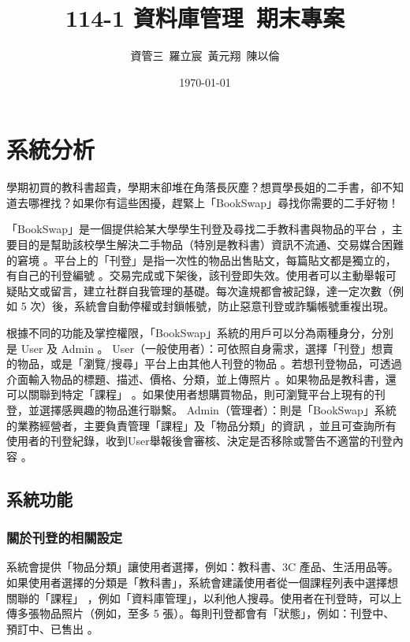 \documentclass[a4paper]{article}
\title{114-1 資料庫管理\ 期末專案}
\author{資管三~羅立宸~黃元翔~陳以倫}
\date{\today} %
\begin{document}
\maketitle %

\section{系統分析} %
學期初買的教科書超貴，學期末卻堆在角落長灰塵？想買學長姐的二手書，卻不知道去哪裡找？如果你有這些困擾，趕緊上「BookSwap」尋找你需要的二手好物！

「BookSwap」是一個提供給某大學學生刊登及尋找二手教科書與物品的平台 ，主要目的是幫助該校學生解決二手物品（特別是教科書）資訊不流通、交易媒合困難的窘境 。平台上的「刊登」是指一次性的物品出售貼文，每篇貼文都是獨立的，有自己的刊登編號 。交易完成或下架後，該刊登即失效。使用者可以主動舉報可疑貼文或留言，建立社群自我管理的基礎。每次違規都會被記錄，達一定次數（例如 5 次）後，系統會自動停權或封鎖帳號，防止惡意刊登或詐騙帳號重複出現。

根據不同的功能及掌控權限，「BookSwap」系統的用戶可以分為兩種身分，分別是 User 及 Admin 。
User（一般使用者）：可依照自身需求，選擇「刊登」想賣的物品，或是「瀏覽/搜尋」平台上由其他人刊登的物品 。若想刊登物品，可透過介面輸入物品的標題、描述、價格、分類，並上傳照片 。如果物品是教科書，還可以關聯到特定「課程」 。如果使用者想購買物品，則可瀏覽平台上現有的刊登，並選擇感興趣的物品進行聯繫。
Admin（管理者）：則是「BookSwap」系統的業務經營者，主要負責管理「課程」及「物品分類」的資訊 ，並且可查詢所有使用者的刊登紀錄，收到User舉報後會審核、決定是否移除或警告不適當的刊登內容 。
\subsection{系統功能}
\subsubsection{關於刊登的相關設定}
系統會提供「物品分類」讓使用者選擇，例如：教科書、3C 產品、生活用品等。如果使用者選擇的分類是「教科書」，系統會建議使用者從一個課程列表中選擇想關聯的「課程」 ，例如「資料庫管理」，以利他人搜尋。使用者在刊登時，可以上傳多張物品照片（例如，至多 5 張）。每則刊登都會有「狀態」，例如：刊登中、預訂中、已售出 。
\end{document}
